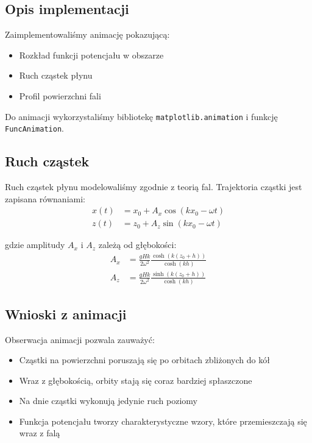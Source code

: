 \documentclass[12pt,a4paper]{article}
\begin{document}
\subsection{Opis implementacji}

Zaimplementowaliśmy animację pokazującą:
\begin{itemize}
    \item Rozkład funkcji potencjału w obszarze
    \item Ruch cząstek płynu
    \item Profil powierzchni fali
\end{itemize}

Do animacji wykorzystaliśmy bibliotekę \texttt{matplotlib.animation} i funkcję \texttt{FuncAnimation}.

\subsection{Ruch cząstek}

Ruch cząstek płynu modelowaliśmy zgodnie z teorią fal. Trajektoria cząstki jest zapisana równaniami:
\begin{align}
x(t) &= x_0 + A_x \cos(kx_0 - \omega t) \\
z(t) &= z_0 + A_z \sin(kx_0 - \omega t)
\end{align}

gdzie amplitudy $A_x$ i $A_z$ zależą od głębokości:
\begin{align}
A_x &= \frac{gHk}{2\omega^2} \frac{\cosh(k(z_0+h))}{\cosh(kh)} \\
A_z &= \frac{gHk}{2\omega^2} \frac{\sinh(k(z_0+h))}{\cosh(kh)}
\end{align}

\subsection{Wnioski z animacji}

Obserwacja animacji pozwala zauważyć:
\begin{itemize}
    \item Cząstki na powierzchni poruszają się po orbitach zbliżonych do kół
    \item Wraz z głębokością, orbity stają się coraz bardziej spłaszczone
    \item Na dnie cząstki wykonują jedynie ruch poziomy
    \item Funkcja potencjału tworzy charakterystyczne wzory, które przemieszczają się wraz z falą
\end{itemize}
\end{document}
